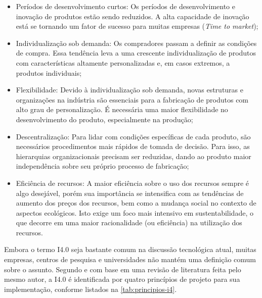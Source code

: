 	\begin{itemize}

		\item Períodos de desenvolvimento curtos: Os períodos de desenvolvimento e inovação de produtos estão sendo reduzidos. A alta capacidade de inovação está se tornando um fator de sucesso para muitas empresas (\textit{Time to market});
		
		\item Individualização sob demanda: Os compradores passam a definir as condições de compra. Essa tendência leva a uma crescente individualização de produtos com características altamente personalizadas e, em casos extremos, a produtos individuais;
		
		\item Flexibilidade: Devido à individualização sob demanda, novas estruturas e organizações na indústria são essenciais para a fabricação de produtos com alto grau de personalização. É necessária uma maior flexibilidade no desenvolvimento do produto, especialmente na produção;
		
		\item Descentralização: Para lidar com condições específicas de cada produto, são necessários procedimentos mais rápidos de tomada de decisão. Para isso, as hierarquias organizacionais precisam ser reduzidas, dando ao produto maior independência sobre seu próprio processo de fabricação;
		
		\item Eficiência de recursos: A maior eficiência sobre o uso dos recursos sempre é algo desejável, porém sua importância se intensifica com as tendências de aumento dos preços dos recursos, bem como a mudança social no contexto de aspectos ecológicos. Isto exige um foco mais intensivo em sustentabilidade, o que decorre em uma maior racionalidade (ou eficiência) na utilização dos recursos.

	\end{itemize}

	Embora o termo I4.0 seja bastante comum na discussão tecnológica atual, muitas empresas, centros de pesquisa e universidades não mantém uma definição comum sobre o assunto. Segundo  e com base em uma revisão de literatura feita pelo mesmo autor, a I4.0 é identificada por quatro princípios de projeto para sua implementação, conforme listados na \autoref{tab:principios-i4}.


